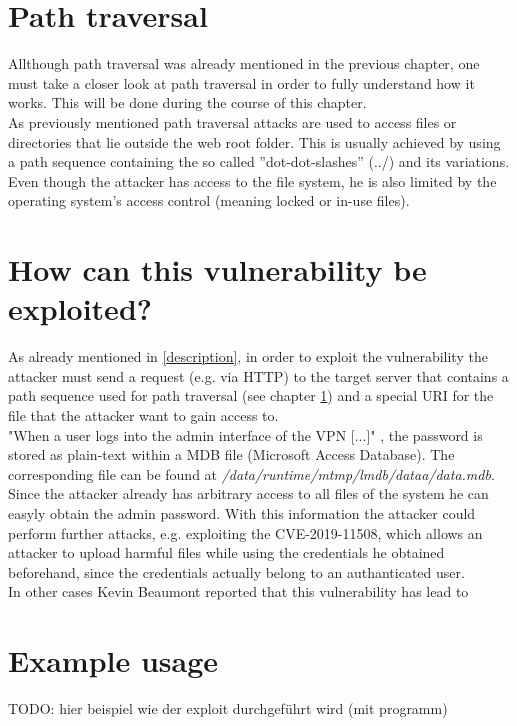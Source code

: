 \section{Path traversal}
\label{path-traversal}
Allthough path traversal was already mentioned in the previous chapter, one must take a closer look at path traversal in order to fully understand how it works. This will be done during the course of this chapter.\\
As previously mentioned path traversal attacks are used to access files or directories that lie outside the web root folder. This is usually achieved by using a path sequence containing the so called ''dot-dot-slashes'' (../) and its variations. Even though the attacker has access to the file system, he is also limited by the operating system's access control (meaning locked or in-use files). \autocite{OWASP-PathTraversal:online}

\section{How can this vulnerability be exploited?}
\label{sec:exploitation}
As already mentioned in \ref{description}, in order to exploit the vulnerability the attacker must send a request (e.g. via HTTP) to the target server that contains a path sequence used for path traversal (see chapter \ref{path-traversal}) and a special URI for the file that the attacker want to gain access to. \autocite{Tenable2:online}\\
"When a user logs into the admin interface of the VPN [...]" \autocite{Tenable2:online}, the password is stored as plain-text within a MDB file (Microsoft Access Database). The corresponding file can be found at \textit{/data/runtime/mtmp/lmdb/dataa/data.mdb}. Since the attacker already has arbitrary access to all files of the system he can easyly obtain the admin password. With this information the attacker could perform further attacks, e.g. exploiting the CVE-2019-11508, which allows an attacker to upload harmful files while using the credentials he obtained beforehand, since the credentials actually belong to an authanticated user. \autocite{Tenable2:online}\\
In other cases Kevin Beaumont reported that this vulnerability has lead to 

\section{Example usage}
\label{example}
TODO: hier beispiel wie der exploit durchgeführt wird (mit programm)

